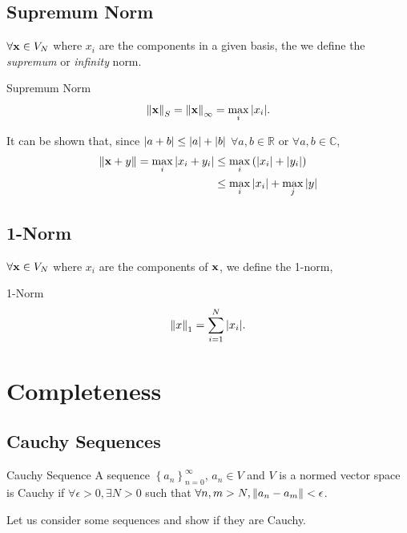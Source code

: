 \documentclass{book}
\begin{document}
\subsection{Supremum Norm}
$\forall \vb{x} \in V_N$ where $x_i$ are the components in a given basis, the we define the \textit{supremum} or \textit{infinity} norm.
\begin{Definitions}{Supremum Norm}{}
	\begin{equation}
		\norm{\vb{x}}_S = \norm{\vb{x}}_{\infty} = \max_i\abs{x_i}.
	\end{equation}
\end{Definitions}
It can be shown that, since $\abs{a + b} \leq \abs{a} + \abs{b}$ $\forall a,b \in \mathbb{R}$ or $\forall a,b \in \mathbb{C}$,
\begin{equation}
	\begin{split}
		\norm{\vb{x} + {y}} = \max_i\abs{x_i + y_i} & \leq \max_i\left(\abs{x_i} + \abs{y_i}\right) \\
		& \leq \max_i\abs{x_i} + \max_j\abs{y}
	\end{split}
\end{equation}
\subsection{1-Norm}
$\forall \vb{x} \in V_N$ where $x_i$ are the components of $\vb{x}$, we define the 1-norm,
\begin{Definitions}{1-Norm}{}
	\begin{equation}
		\norm{x}_1 = \sum_{i=1}^N \abs{x_i}.
	\end{equation}
\end{Definitions}
\section{Completeness}
\subsection{Cauchy Sequences}
\begin{Definitions}{Cauchy Sequence}{}
	A sequence $\left\{a_n\right\}_{n=0}^{\infty}$, $a_n \in V$ and $V$ is a normed vector space is Cauchy if $\forall \epsilon > 0, \exists N > 0$ such that $\forall n,m > N, \norm{a_n - a_m} < \epsilon$.
\end{Definitions}
Let us consider some sequences and show if they are Cauchy.
\end{document}
